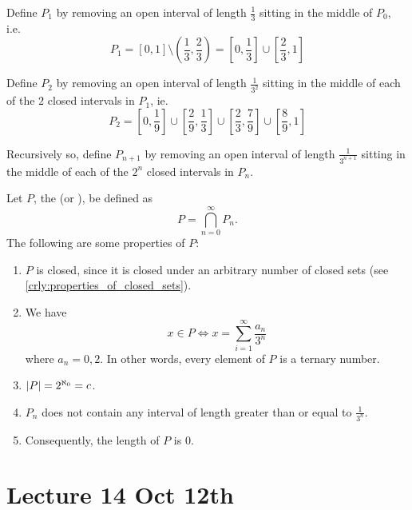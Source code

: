 \documentclass[notoc,notitlepage]{tufte-book}
\begin{document}
\begin{eg}
  Define $P_1$ by removing an open interval of length $\frac{1}{3}$ sitting in the middle of $P_0$, i.e.
  \begin{equation*}
    P_1 = [0, 1] \setminus \left(\frac{1}{3}, \frac{2}{3}\right) = \left[0, \frac{1}{3}\right] \cup \left[ \frac{2}{3}, 1 \right]
  \end{equation*}

  Define $P_2$ by removing an open interval of length $\frac{1}{3^2}$ sitting in the middle of each of the $2$ closed intervals in $P_1$, ie.
  \begin{equation*}
    P_2 = \left[0, \frac{1}{9}\right] \cup \left[ \frac{2}{9}, \frac{1}{3} \right] \cup \left[ \frac{2}{3}, \frac{7}{9} \right] \cup \left[ \frac{8}{9}, 1 \right]
  \end{equation*}

  Recursively so, define $P_{n + 1}$ by removing an open interval of length $\frac{1}{3^{n + 1}}$ sitting in the middle of each of the $2^n$ closed intervals in $P_n$.

  Let $P$, the  (or ), be defined as
  \begin{equation*}
    P = \bigcap_{n = 0}^{\infty} P_n.
  \end{equation*}
  The following are some properties of $P$:
  \begin{enumerate}
    \item $P$ is closed, since it is closed under an arbitrary number of closed sets (see \cref{crly:properties_of_closed_sets}).
    \item We have
      \begin{equation*}
        x \in P \iff x = \sum_{i=1}^{\infty} \frac{a_n}{3^n}
      \end{equation*}
      where $a_n = 0, 2$. In other words, every element of $P$ is a ternary number.
    \item $\left|P\right| = 2^{\aleph_0} = c$.
    \item $P_n$ does not contain any interval of length greater than or equal to $\frac{1}{3^n}$.
    \item Consequently, the length of $P$ is $0$.
  \end{enumerate}
\end{eg}



\chapter{Lecture 14 Oct 12th}%
\label{chp:lecture_14_oct_12th}
\end{document}
